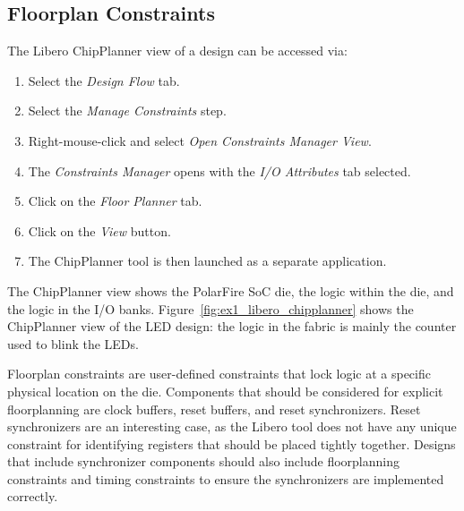 \clearpage
\subsection{Floorplan Constraints}

The Libero ChipPlanner view of a design can be accessed via:
%
\begin{enumerate}
\item Select the \emph{Design Flow} tab.
\item Select the \emph{Manage Constraints} step.
\item Right-mouse-click and select \emph{Open Constraints Manager View}.
\item The \emph{Constraints Manager} opens with the \emph{I/O Attributes}
tab selected.
\item Click on the \emph{Floor Planner} tab.
\item Click on the \emph{View} button.
\item The ChipPlanner tool is then launched as a separate application.
\end{enumerate}
%
The ChipPlanner view shows the PolarFire SoC die, the logic within the die,
and the logic in the I/O banks.
%
Figure~\ref{fig:ex1_libero_chipplanner} shows the ChipPlanner view of
the LED design: the logic in the fabric is mainly the counter used to
blink the LEDs.

Floorplan constraints are user-defined constraints that lock logic at a
specific physical location on the die. Components that should be considered
for explicit floorplanning are clock buffers, reset buffers, and reset
synchronizers. Reset synchronizers are an interesting case, as the Libero
tool does not have any unique constraint for identifying registers that
should be placed tightly together. Designs that include synchronizer
components should also include floorplanning constraints and timing
constraints to ensure the synchronizers are implemented correctly.

